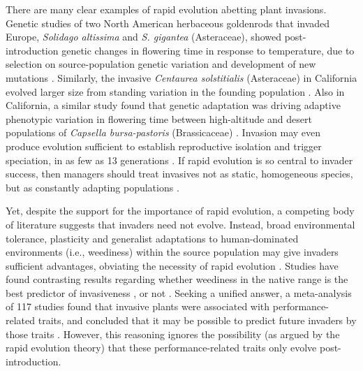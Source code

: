 \documentclass[12pt]{article}\usepackage[]{graphicx}\usepackage[]{color}
\begin{document}
	There are many clear examples of rapid evolution abetting plant invasions. Genetic studies of two North American herbaceous goldenrods that invaded Europe, \textit{Solidago altissima} and \textit{S. gigantea} (Asteraceae), showed post-introduction genetic changes in flowering time in response to temperature, due to selection on source-population genetic variation and development of new mutations \parencite{Weber1998}. Similarly, the invasive \textit{Centaurea solstitialis} (Asteraceae) in California evolved larger size from standing variation in the founding population \parencite{Barker2017}. Also in California, a similar study found that genetic adaptation was driving adaptive phenotypic variation in flowering time between high-altitude and desert populations of \textit{Capsella bursa-pastoris} (Brassicaceae) \parencite{Linde2001}. Invasion may even produce evolution sufficient to establish reproductive isolation and trigger speciation, in as few as 13 generations \parencite{Hendry2000}. If rapid evolution is so central to invader success, then managers should treat invasives not as static, homogeneous species, but as constantly adapting populations \parencite{Lee2002invasion}. %
	
	Yet, despite the support for the importance of rapid evolution, a competing body of literature suggests that invaders need not evolve. Instead, broad environmental tolerance, plasticity and generalist adaptations to human-dominated environments (i.e., weediness) within the source population may give invaders sufficient advantages, obviating the necessity of rapid evolution \parencite{Richards2006,Schwartz1994,Bock2015,Rejmanek1996,Baker1965}. %
	Studies have found contrasting results regarding whether weediness in the native range is the best predictor of invasiveness %
	\parencite[e.g.,][]{Maillet2000}, or not \parencite{Perrins1992,Mack1996}. Seeking a unified answer, a meta-analysis of 117 studies found that invasive plants were associated with performance-related traits, and concluded that it may be possible to predict future invaders by those traits \parencite{VanKleunen2010}. However, this reasoning ignores the possibility (as argued by the rapid evolution theory) that these performance-related traits only evolve post-introduction. 
	
\end{document}
